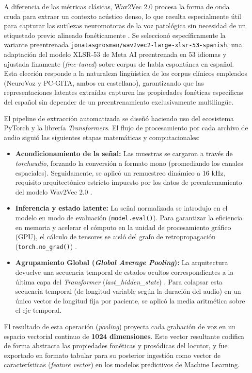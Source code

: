     A diferencia de las métricas clásicas, Wav2Vec 2.0 procesa la forma de onda cruda para extraer un contexto acústico denso, lo que resulta especialmente útil para capturar las sutilezas neuromotoras de la voz patológica sin necesidad de un etiquetado previo alineado fonéticamente \cite{baevski2020}. Se seleccionó específicamente la variante preentrenada \texttt{jonatasgrosman/wav2vec2-large-xlsr-53-spanish}, una adaptación del modelo XLSR-53 de Meta AI preentrenada en 53 idiomas y ajustada finamente (\textit{fine-tuned}) sobre corpus de habla espontánea en español. Esta elección responde a la naturaleza lingüística de los corpus clínicos empleados (NeuroVoz y PC-GITA, ambos en castellano), garantizando que las representaciones latentes extraídas capturen las propiedades fonéticas específicas del español sin depender de un preentrenamiento exclusivamente multilingüe.

    El pipeline de extracción automatizada se diseñó haciendo uso del ecosistema PyTorch y la librería \textit{Transformers}. El flujo de procesamiento por cada archivo de audio siguió las siguientes etapas matemáticas y computacionales:

    \begin{itemize}
        \item \textbf{Acondicionamiento de la señal:} Las muestras se cargaron a través de \textit{torchaudio}, forzando la conversión a formato mono (promediando los canales espaciales). Seguidamente, se aplicó un remuestreo dinámico a 16 kHz, requisito arquitectónico estricto impuesto por los datos de preentrenamiento del modelo Wav2Vec 2.0 \cite{wolfTransformersStateoftheArtNatural2020}.
        
        \item \textbf{Inferencia y estado latente:} La señal normalizada se introdujo en el modelo en modo de evaluación (\texttt{model.eval()}). Para garantizar la eficiencia en memoria y acelerar el cómputo en la unidad de procesamiento gráfico (GPU), el cálculo de tensores se aisló del grafo de retropropagación (\texttt{torch.no\_grad()}) \cite{paszke2019}.
        
        \item \textbf{Agrupamiento Global (\textit{Global Average Pooling}):} La arquitectura devuelve una secuencia temporal de estados ocultos correspondientes a la última capa del \textit{Transformer} (\textit{last\_hidden\_state}) \cite{wolfTransformersStateoftheArtNatural2020}. Para colapsar esta secuencia temporal (de longitud variable según la duración del audio) en un único vector de longitud fija por paciente, se aplicó la media aritmética sobre el eje temporal. 
    \end{itemize}

    El resultado de esta operación (\textit{pooling}) proyecta cada grabación de voz en un espacio vectorial continuo de \textbf{1024 dimensiones}. Este vector resultante codifica de forma abstracta las propiedades fonéticas y prosódicas del locutor, y fue exportado en formato tabular para su posterior ingestión como vector de características (\textit{feature vector}) en los modelos predictivos de Machine Learning.      
